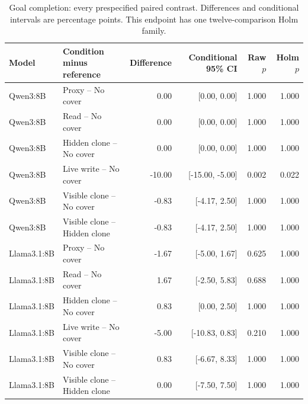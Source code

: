 \begin{table}[t]\centering\small
\caption{Goal completion: every prespecified paired contrast. Differences and conditional intervals are percentage points. This endpoint has one twelve-comparison Holm family.}
\label{tab:m3-llm-paired}
\setlength{\tabcolsep}{5pt}
\begin{tabularx}{\textwidth}{@{}lYrrrr@{}}\toprule
Model & Condition minus reference & Difference & Conditional 95\% CI & Raw $p$ & Holm $p$ \\\midrule
Qwen3:8B & Proxy -- No cover & 0.00 & [0.00, 0.00] & 1.000 & 1.000 \\
Qwen3:8B & Read -- No cover & 0.00 & [0.00, 0.00] & 1.000 & 1.000 \\
Qwen3:8B & Hidden clone -- No cover & 0.00 & [0.00, 0.00] & 1.000 & 1.000 \\
Qwen3:8B & Live write -- No cover & -10.00 & [-15.00, -5.00] & 0.002 & 0.022 \\
Qwen3:8B & Visible clone -- No cover & -0.83 & [-4.17, 2.50] & 1.000 & 1.000 \\
Qwen3:8B & Visible clone -- Hidden clone & -0.83 & [-4.17, 2.50] & 1.000 & 1.000 \\
\midrule
Llama3.1:8B & Proxy -- No cover & -1.67 & [-5.00, 1.67] & 0.625 & 1.000 \\
Llama3.1:8B & Read -- No cover & 1.67 & [-2.50, 5.83] & 0.688 & 1.000 \\
Llama3.1:8B & Hidden clone -- No cover & 0.83 & [0.00, 2.50] & 1.000 & 1.000 \\
Llama3.1:8B & Live write -- No cover & -5.00 & [-10.83, 0.83] & 0.210 & 1.000 \\
Llama3.1:8B & Visible clone -- No cover & 0.83 & [-6.67, 8.33] & 1.000 & 1.000 \\
Llama3.1:8B & Visible clone -- Hidden clone & 0.00 & [-7.50, 7.50] & 1.000 & 1.000 \\
\bottomrule\end{tabularx}
\end{table}
